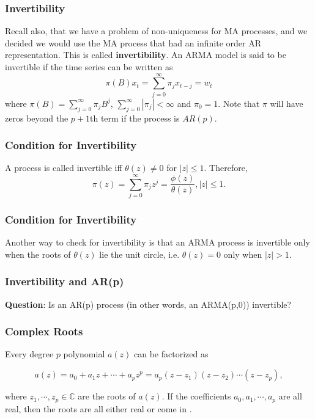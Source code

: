 \documentclass[%
xcolor=pdftex]{beamer}
\begin{document}
\begin{frame}
\frametitle{Invertibility}

Recall also, that we have a problem of non-uniqueness for MA processes, and we decided we would use the MA process that had an infinite order AR representation.  This is called {\bf invertibility}. An ARMA model is said to be invertible if the time series can be written as
\begin{equation} \label{eq:invert}
\pi(B) x_t = \sum_{j=0}^\infty \pi_j x_{t-j}=w_t
\end{equation}
where $\pi(B) = \sum_{j=0}^\infty \pi_j  B^j $, $ \sum_{j=0}^\infty |\pi_j| < \infty$ and $\pi_0=1$. Note that $\pi$ will have zeros beyond the $p+1$th term if the process is $AR(p)$.

\end{frame}

\begin{frame}
\frametitle{Condition for Invertibility}

A process is called invertible iff $\theta(z) \neq 0$ for $|z|\leq1$.  Therefore,
\begin{equation} \label{eq:invert_rep}
\pi(z)=\sum_{j=0}^\infty \pi_j z^j=\frac{\phi(z)}{\theta(z)},  |z|\leq 1.
\end{equation}

\end{frame}

\begin{frame}
\frametitle{Condition for Invertibility}

Another way to check for invertibility is that an ARMA process is invertible only when the roots of $\theta(z)$ lie \underline{\hspace{13 mm}} the unit circle, i.e. $\theta(z)=0$ only when $|z| > 1$.

\end{frame}

\begin{frame}
\frametitle{Invertibility and AR(p)}

\textbf{Question}: Is an AR(p) process (in other words, an ARMA(p,0)) invertible?

\vspace{40mm}

\end{frame}

\begin{frame}
\frametitle{Complex Roots}

Every degree $p$ polynomial $a(z)$ can be factorized as

$$
a(z) = a_0 + a_1 z + \cdots + a_p z^p = a_p(z-z_1)(z-z_2)\cdots(z-z_p),
$$

where $z_1, \cdots, z_p \in \mathbb{C}$ are the roots of $a(z)$. If the coefficients $a_0, a_1, \cdots, a_p$ are all real, then the roots are all either real or come in \underline{\hspace{45 mm}}.

\end{frame}
\end{document}
